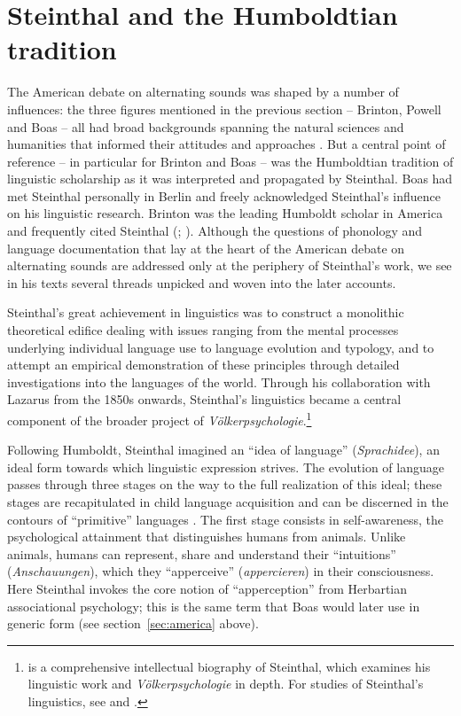\documentclass[output=paper]{langscibook}
\begin{document}
\section{Steinthal and the Humboldtian tradition}
\label{sec:humboldtian}

The American debate on alternating sounds was shaped by a number of influences: the three figures mentioned in the previous section – Brinton, Powell and Boas – all had broad backgrounds spanning the natural sciences and humanities that informed their attitudes and approaches \citep[see][]{Darnell1998}. But a central point of reference – in particular for Brinton and Boas – was the Humboldtian tradition of linguistic scholarship as it was interpreted and propagated by Steinthal. Boas had met Steinthal personally in Berlin and freely acknowledged Steinthal's influence on his linguistic research. Brinton was the leading Humboldt scholar in America and frequently cited Steinthal (\citealt[see][63-69]{Bunzl1996}; \citealt[289-292]{TrautmannWaller2006}). Although the questions of phonology and language documentation that lay at the heart of the American debate on alternating sounds are addressed only at the periphery of Steinthal's work, we see in his texts several threads unpicked and woven into the later accounts.

Steinthal's great achievement in linguistics was to construct a monolithic theoretical edifice dealing with issues ranging from the mental processes underlying individual language use to language evolution and typology, and to attempt an empirical demonstration of these principles through detailed investigations into the languages of the world. Through his collaboration with Lazarus from the 1850s onwards, Steinthal's linguistics became a central component of the broader project of \emph{Völkerpsychologie}.\footnote{\citet{TrautmannWaller2006} is a comprehensive intellectual biography of Steinthal, which examines his linguistic work and \emph{Völkerpsychologie} in depth. For studies of Steinthal's linguistics, see \citet{Bumann1965} and \citet{Ringmacher1996}.} 

Following Humboldt, Steinthal imagined an ``idea of language'' (\emph{Sprachidee}), an ideal form towards which linguistic expression strives. The evolution of language passes through three stages on the way to the full realization of this ideal; these stages are recapitulated in child language acquisition and can be discerned in the contours of ``primitive'' languages \citep[cf.][81-93]{Bumann1965}. The first stage consists in self-awareness, the psychological attainment that distinguishes humans from animals. Unlike animals, humans can represent, share and understand their ``intuitions'' (\emph{Anschauungen}), which they ``apperceive'' (\emph{appercieren}) in their consciousness. Here Steinthal invokes the core notion of ``apperception'' from Herbartian associational psychology; this is the same term that Boas would later use in generic form (see section~\ref{sec:america} above). 
\end{document}
